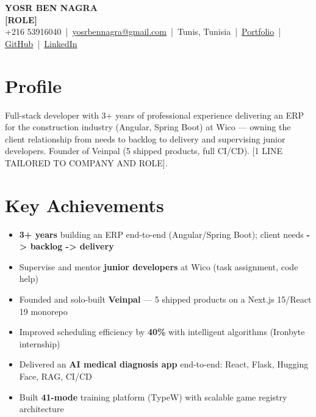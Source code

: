 \documentclass[10pt,a4paper]{article}
\begin{document}
\vspace*{0pt}
{\color{white}
  {\huge\bfseries YOSR BEN NAGRA}\\[3pt]
  {\large\color{accent}\bfseries [ROLE]}\\[5pt]
  {\small
    +216 53916040 \,|\, \href{mailto:yosrbennagra@gmail.com}{\color{white}yosrbennagra@gmail.com} \,|\, Tunis, Tunisia \,|\,
    \href{https://portfolio-yosr.vercel.app/en}{\color{white}Portfolio} \,|\,
    \href{https://github.com/YosrBennagra}{\color{white}GitHub} \,|\,
    \href{https://www.linkedin.com/in/yosr-ben-nagra/}{\color{white}LinkedIn}
  }
}
\vspace{0.75cm}

\section*{Profile}
{\small
Full-stack developer with 3+ years of professional experience delivering an ERP
for the construction industry (Angular, Spring Boot) at Wico --- owning the client
relationship from needs to backlog to delivery and supervising junior developers.
Founder of Veinpal (5 shipped products, full CI/CD).
[1 LINE TAILORED TO COMPANY AND ROLE].
}

\section*{Key Achievements}
{\small
\begin{itemize}[leftmargin=12pt,itemsep=1pt,topsep=1pt,parsep=0pt]
  \item \textbf{3+ years} building an ERP end-to-end (Angular/Spring Boot); client needs \textbf{-> backlog -> delivery}
  \item Supervise and mentor \textbf{junior developers} at Wico (task assignment, code help)
  \item Founded and solo-built \textbf{Veinpal} --- 5 shipped products on a Next.js 15/React 19 monorepo
  \item Improved scheduling efficiency by \textbf{40\%} with intelligent algorithms (Ironbyte internship)
  \item Delivered an \textbf{AI medical diagnosis app} end-to-end: React, Flask, Hugging Face, RAG, CI/CD
  \item Built \textbf{41-mode} training platform (TypeW) with scalable game registry architecture
\end{itemize}
}
\end{document}
